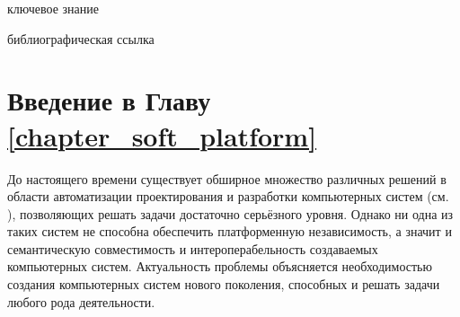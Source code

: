 \begin{SCn}
\bigskip

\begin{scnrelfromlist}{ключевое знание}
\end{scnrelfromlist}

\bigskip

\begin{scnrelfromlist}{библиографическая ссылка}
\end{scnrelfromlist}

\end{SCn}


\section*{Введение в Главу \ref{chapter_soft_platform}~}

До настоящего времени существует обширное множество различных решений в области автоматизации проектирования и разработки компьютерных систем (см. ), позволяющих решать задачи достаточно серьёзного уровня. Однако ни одна из таких систем не способна обеспечить платформенную независимость, а значит и семантическую совместимость и интероперабельность создаваемых компьютерных систем. Актуальность проблемы объясняется необходимостью создания компьютерных систем нового поколения, способных  и  решать задачи любого рода деятельности.

